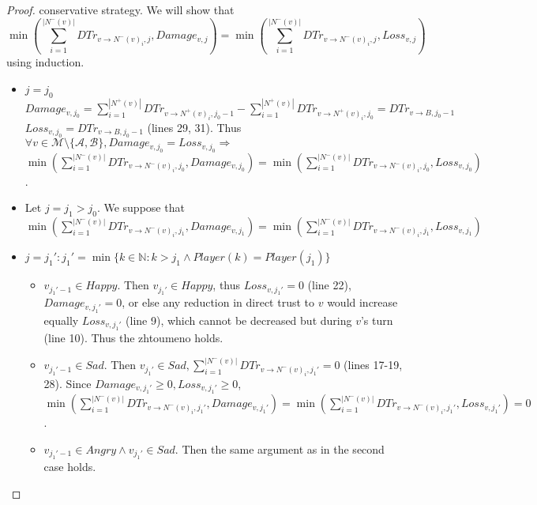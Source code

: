 \documentclass[11pt]{article}
\theoremstyle{definition}
\theoremstyle{corollary}
\theoremstyle{lemma}
\begin{document}
\begin{proof}
       conservative strategy. We will show that $$\min(\sum\limits_{i=1}^{|N^{-}(v)|}DTr_{v \rightarrow N^{-}(v)_i, j},
       Damage_{v,j}) = \min(\sum\limits_{i=1}^{|N^{-}(v)|}DTr_{v \rightarrow N^{-}(v)_i, j}, Loss_{v,j})$$ using induction.
       \begin{itemize}
          \item $j = j_0$ \\  $Damage_{v,j_0} = \sum\limits_{i=1}^{|N^{+}(v)|}DTr_{v \rightarrow N^{+}(v)_i, j_0 - 1} -
          \sum\limits_{i=1}^{|N^{+}(v)|}DTr_{v \rightarrow N^{+}(v)_i,j_0} = DTr_{v \rightarrow B, j_0 - 1}$ \\
          $Loss_{v,j_0} = DTr_{v \rightarrow B, j_0 - 1}$ (lines 29, 31). Thus $\forall v \in \mathcal{M \setminus \{A,B\}},
          Damage_{v,j_0} = Loss_{v,j_0} \Rightarrow$ \\ $\min(\sum\limits_{i=1}^{|N^{-}(v)|}DTr_{v \rightarrow N^{-}(v)_i,
          j_0}, Damage_{v,j_0}) = \min(\sum\limits_{i=1}^{|N^{-}(v)|}DTr_{v \rightarrow N^{-}(v)_i, j_0}, Loss_{v,j_0})$.
          \item Let $j = j_1 > j_0$. We suppose that \\
          $\min(\sum\limits_{i=1}^{|N^{-}(v)|}DTr_{v \rightarrow N^{-}(v)_i, j_1}, Damage_{v,j_1})
          = \min(\sum\limits_{i=1}^{|N^{-}(v)|}DTr_{v \rightarrow N^{-}(v)_i, j_1}, Loss_{v,j_1})$ 
          \item $j = j_1' : j_1' = \min\{k \in \mathbb{N} : k > j_1 \wedge Player(k) = Player(j_1)\}$ \\ 
          \begin{itemize}
             \item $v_{j_1'-1} \in Happy$. Then $v_{j_1'} \in Happy$, thus $Loss_{v, j_1'} = 0$ (line 22), $Damage_{v, j_1'}
             = 0$, or else any reduction in direct trust to $v$ would increase equally $Loss_{v, j_1'}$
             (line 9), which cannot be decreased but during $v$'s turn (line 10). Thus the zhtoumeno holds.
             \item $v_{j_1'-1} \in Sad$. Then $v_{j_1'} \in Sad, \sum\limits_{i=1}^{|N^{-}(v)|}DTr_{v \rightarrow N^{-}(v)_i,
             j_1'} = 0$ (lines 17-19, 28). Since $Damage_{v, j_1'} \geq 0, Loss_{v, j_1'} \geq 0$, $\min(\sum\limits_{i=1}^
             {|N^{-}(v)|}DTr_{v \rightarrow N^{-}(v)_i, j_1'}, Damage_{v,j_1'}) = \min(\sum\limits_{i=1}^{|N^{-}(v)|}DTr_{v
             \rightarrow N^{-}(v)_i, j_1'}, Loss_{v,j_1'}) = 0$.
             \item $v_{j_1'-1} \in Angry \wedge v_{j_1'} \in Sad$. Then the same argument as in the second case holds.

\end{itemize}
\end{itemize}
\end{proof}
\end{document}
